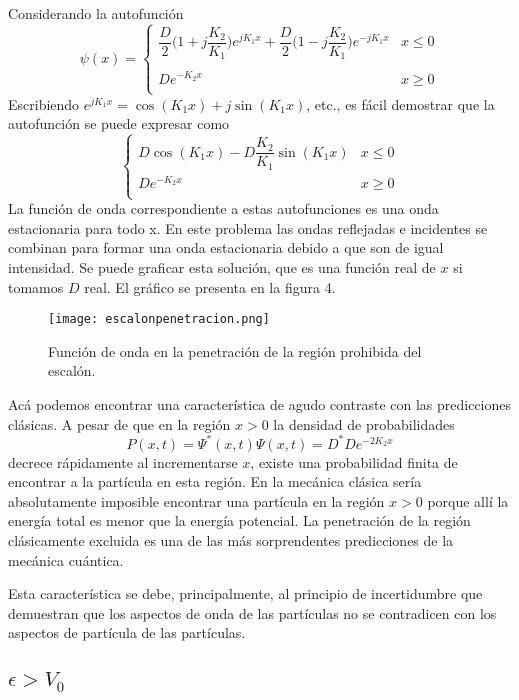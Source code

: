\documentclass[12pt,a4paper]{article}
\def\e{{\epsilon}} %
\begin{document}
Considerando la autofunción
\[
\psi(x)=
\left\{
\begin{array}{ll}
\dfrac{D}{2}\bigg( 1+j\dfrac{K_{2}}{K_{1}} \bigg)e^{jK_{1}x}+\dfrac{D}{2}\bigg( 1-j\dfrac{K_{2}}{K_{1}} \bigg)e^{-jK_{1}x} & x \leq 0 \\
 & \\
De^{-K_{2}x} & x \geq 0 \\
\end{array}
\right.
\]
Escribiendo $e^{jK_{1}x}=\cos(K_{1}x)+j\sin(K_{1}x)$, etc., es fácil demostrar que la autofunción se puede expresar como
\[
\left\{
\begin{array}{ll}
D \cos (K_{1}x)-D\dfrac{K_{2}}{K_{1}} \sin (K_{1}x) & x \leq 0 \\
De^{-K_{2}x} & x \geq 0 \\
\end{array}
\right.
\]
La función de onda correspondiente a estas autofunciones es una onda estacionaria para todo x. En este problema las ondas reflejadas e incidentes se combinan para formar una onda estacionaria debido a que son de igual intensidad. Se puede graficar esta solución, que es una función real de $x$ si tomamos $D$ real. El gráfico se presenta en la figura 4.

\begin{figure}[ht!]
\begin{center}
\texttt{[image: escalonpenetracion.png]}
\caption{Función de onda en la penetración de la región prohibida del escalón.}
\end{center}
\end{figure}

Acá podemos encontrar una característica de agudo contraste con las predicciones clásicas. A pesar de que en la región $x>0$ la densidad de probabilidades
\[ P(x,t)=\Psi^{\ast}(x,t)\Psi(x,t)=D^{\ast}De^{-2K_{2}x} \]
decrece rápidamente al incrementarse $x$, existe una probabilidad finita de encontrar a la partícula en esta región. En la mecánica clásica sería absolutamente imposible encontrar una partícula en la región $x>0$ porque allí la energía total es menor que la energía potencial. La penetración de la región clásicamente excluida es una de las más sorprendentes predicciones de la mecánica cuántica.

Esta característica se debe, principalmente, al principio de incertidumbre que demuestran que los aspectos de onda de las partículas no se contradicen con los aspectos de partícula de las partículas.

\subsection{$\e>V_{0}$}
\end{document}
